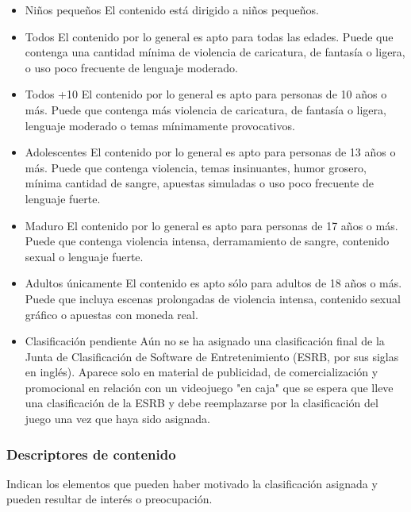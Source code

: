 			\begin{itemize}
				
			
			\item Niños pequeños
			El contenido está dirigido a niños pequeños.
			
			\item Todos
			El contenido por lo general es apto para todas las edades. Puede que contenga una cantidad mínima de violencia de caricatura, de fantasía o ligera, o uso poco frecuente de lenguaje moderado.
			
			\item Todos +10
			El contenido por lo general es apto para personas de 10 años o más. Puede que contenga más violencia de caricatura, de fantasía o ligera, lenguaje moderado o temas mínimamente provocativos.
			
			\item Adolescentes
			El contenido por lo general es apto para personas de 13 años o más. Puede que contenga violencia, temas insinuantes, humor grosero, mínima cantidad de sangre, apuestas simuladas o uso poco frecuente de lenguaje fuerte.
			
			\item Maduro
			El contenido por lo general es apto para personas de 17 años o más. Puede que contenga violencia intensa, derramamiento de sangre, contenido sexual o lenguaje fuerte.
			
			\item Adultos únicamente
			El contenido es apto sólo para adultos de 18 años o más. Puede que incluya escenas prolongadas de violencia intensa, contenido sexual gráfico o apuestas con moneda real.
			
			\item Clasificación pendiente
			Aún no se ha asignado una clasificación final de la Junta de Clasificación de Software de Entretenimiento (ESRB, por sus siglas en inglés). Aparece solo en material de publicidad, de comercialización y promocional en relación con un videojuego "en caja" que se espera que lleve una clasificación de la ESRB y debe reemplazarse por la clasificación del juego una vez que haya sido asignada.
			
		\end{itemize}
			
			
			\subsubsection{Descriptores de contenido} 
			Indican los elementos que pueden haber motivado la clasificación asignada y pueden resultar de interés o preocupación.
			
